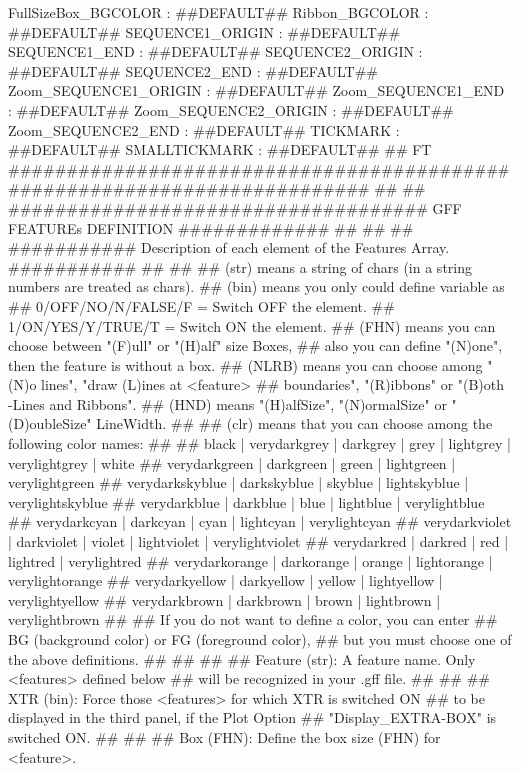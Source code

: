 \documentclass[11pt]{article}
\begin{document}
FullSizeBox_BGCOLOR   : ##DEFAULT##
Ribbon_BGCOLOR        : ##DEFAULT##
SEQUENCE1_ORIGIN      : ##DEFAULT##
SEQUENCE1_END         : ##DEFAULT##
SEQUENCE2_ORIGIN      : ##DEFAULT##
SEQUENCE2_END         : ##DEFAULT##
Zoom_SEQUENCE1_ORIGIN : ##DEFAULT##
Zoom_SEQUENCE1_END    : ##DEFAULT##
Zoom_SEQUENCE2_ORIGIN : ##DEFAULT##
Zoom_SEQUENCE2_END    : ##DEFAULT##
TICKMARK              : ##DEFAULT##
SMALLTICKMARK         : ##DEFAULT##
##
FT ########################################################################## ##
## #################################### GFF FEATUREs DEFINITION ############# ##
## 
## ########### Description of each element of the Features Array. ########### ##
##
## (str) means a string of chars (in a string numbers are treated as chars).
## (bin) means you only could define variable as
##       0/OFF/NO/N/FALSE/F = Switch OFF the element.
##       1/ON/YES/Y/TRUE/T  = Switch ON  the element.
## (FHN) means you can choose between "(F)ull" or "(H)alf" size Boxes,
##       also you can define "(N)one", then the feature is without a box.
## (NLRB) means you can choose among "(N)o lines", "draw (L)ines at <feature>
##       boundaries", "(R)ibbons" or "(B)oth -Lines and Ribbons".
## (HND) means "(H)alfSize", "(N)ormalSize" or "(D)oubleSize" LineWidth.
##
## (clr) means that you can choose among the following color names:
##
##    black | verydarkgrey | darkgrey | grey | lightgrey | verylightgrey | white
##       verydarkgreen | darkgreen | green | lightgreen | verylightgreen
##   verydarkskyblue | darkskyblue | skyblue | lightskyblue | verylightskyblue
##          verydarkblue | darkblue | blue | lightblue | verylightblue
##         verydarkcyan | darkcyan | cyan | lightcyan | verylightcyan
##     verydarkviolet | darkviolet | violet | lightviolet | verylightviolet
##            verydarkred | darkred | red | lightred | verylightred
##     verydarkorange | darkorange | orange | lightorange | verylightorange
##     verydarkyellow | darkyellow | yellow | lightyellow | verylightyellow
##        verydarkbrown | darkbrown | brown | lightbrown | verylightbrown 
##
##       If you do not want to define a color, you can enter
##        BG (background color) or FG (foreground color), 
##        but you must choose one of the above definitions.
## 
## ## 
## Feature (str): A feature name. Only <features> defined below
##    will be recognized in your .gff file.
## ## 
## XTR (bin): Force those <features> for which XTR is switched ON
##   to be displayed in the third panel, if the Plot Option 
##   "Display_EXTRA-BOX" is switched ON.
## ## 
## Box (FHN): Define the box size (FHN) for <feature>.
\end{document}
